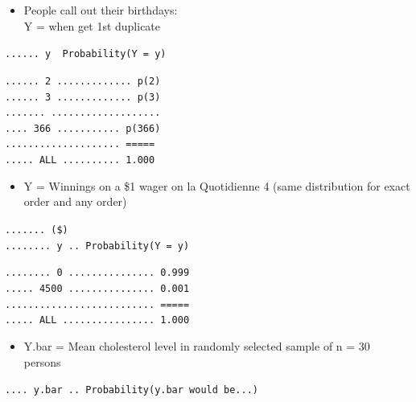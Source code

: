 \documentclass[]{book}
\providecommand{\tightlist}{%
  \setlength{\itemsep}{0pt}\setlength{\parskip}{0pt}}
\begin{document}
\begin{itemize}
\tightlist
\item
  People call out their birthdays:\\
  Y = when get 1st duplicate
\end{itemize}

\texttt{......\ y\ \ Probability(Y\ =\ y)}

\texttt{......\ 2\ .............\ p(2)}\\
\texttt{......\ 3\ .............\ p(3)}~\\
\texttt{.......\ ...................}~\\
\texttt{....\ 366\ ...........\ p(366)}~\\
\texttt{....................\ =====}~\\
\texttt{.....\ ALL\ ..........\ 1.000}

\begin{itemize}
\tightlist
\item
  Y = Winnings on a \$1 wager on la Quotidienne 4
  (same distribution for exact order and any order)
\end{itemize}

\texttt{.......\ (\$)}\\
\texttt{........\ y\ ..\ Probability(Y\ =\ y)}

\texttt{........\ 0\ ...............\ 0.999}~\\
\texttt{.....\ 4500\ ...............\ 0.001}~\\
\texttt{..........................\ =====}~\\
\texttt{.....\ ALL\ ................\ 1.000}

\begin{itemize}
\tightlist
\item
  Y.bar = Mean cholesterol level in randomly selected sample of n = 30 persons
\end{itemize}

\texttt{....\ y.bar\ ..\ Probability(y.bar\ would\ be...)}
\end{document}
